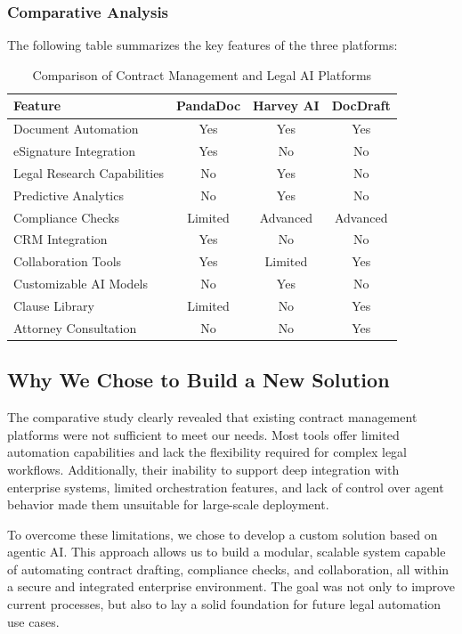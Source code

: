 \subsubsection{Comparative Analysis}
The following table summarizes the key features of the three platforms:
\begin{table}[ht!]
    \centering
    \begin{tabular}{|l|c|c|c|}
        \hline
        \textbf{Feature} & \textbf{PandaDoc} & \textbf{Harvey AI} & \textbf{DocDraft} \\
        \hline
        Document Automation & Yes & Yes & Yes \\
        eSignature Integration & Yes & No & No \\
        Legal Research Capabilities & No & Yes & No \\
        Predictive Analytics & No & Yes & No \\
        Compliance Checks & Limited & Advanced & Advanced \\
        CRM Integration & Yes & No & No \\
        Collaboration Tools & Yes & Limited & Yes \\
        Customizable AI Models & No & Yes & No \\
        Clause Library & Limited & No & Yes \\
        Attorney Consultation & No & No & Yes \\
        \hline
    \end{tabular}
    \caption{Comparison of Contract Management and Legal AI Platforms}
    \label{tab:comparison}
\end{table}

\subsection{Why We Chose to Build a New Solution}
The comparative study clearly revealed that existing contract management platforms were not sufficient to meet our needs. Most tools offer limited automation capabilities and lack the flexibility required for complex legal workflows. Additionally, their inability to support deep integration with enterprise systems, limited orchestration features, and lack of control over agent behavior made them unsuitable for large-scale deployment.\mynewline

To overcome these limitations, we chose to develop a custom solution based on agentic AI. This approach allows us to build a modular, scalable system capable of automating contract drafting, compliance checks, and collaboration, all within a secure and integrated enterprise environment. The goal was not only to improve current processes, but also to lay a solid foundation for future legal automation use cases.\mynewline

